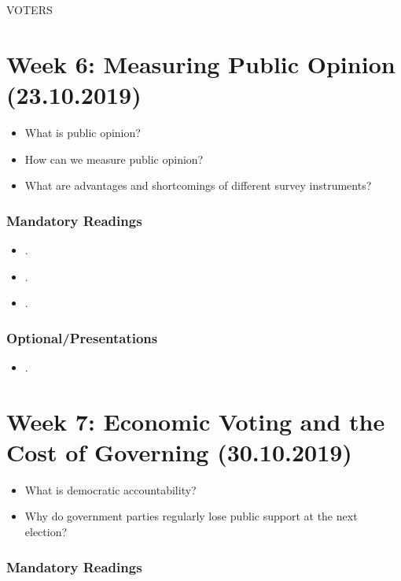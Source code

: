 \documentclass[abstract=on,parskip=full,headings=standardclasses,fontsize=11pt,paper=a4]{scrartcl}
\begin{document}
VOTERS


\section{Week 6: Measuring Public Opinion (23.10.2019)}


\begin{itemize}
\renewcommand\labelitemi{--}
\item What is public opinion?
\item How can we measure public opinion? 
\item What are advantages and shortcomings of different survey instruments?
\end{itemize}


\subsubsection*{Mandatory Readings}
\begin{itemize}
\item {}.
\item {}.
\item {}.
\end{itemize}


\subsubsection*{Optional/Presentations}
\begin{itemize}
\item {}.
\end{itemize}


\section{Week 7: Economic Voting and the Cost of Governing (30.10.2019)}


\begin{itemize}
\renewcommand\labelitemi{--}
\item What is democratic accountability?
\item Why do government parties  regularly lose public support at the next election?
\end{itemize}

\subsubsection*{Mandatory Readings}
\end{document}
